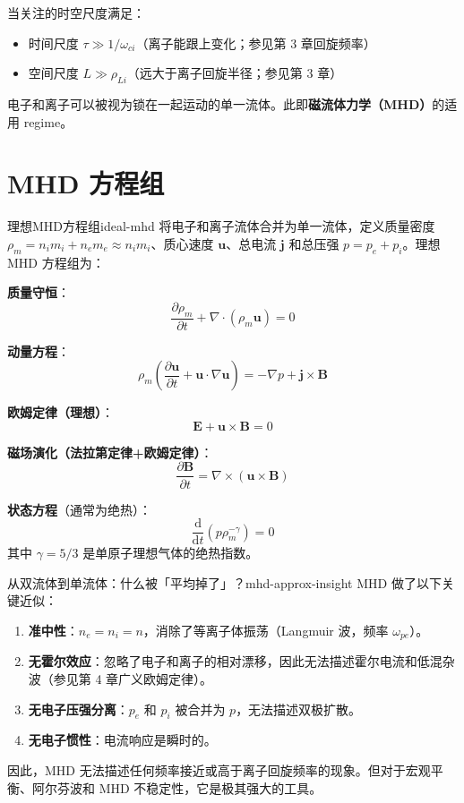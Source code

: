 \documentclass[12pt,a4paper,openany,oneside]{book}
\newcommand{\diffmarktext}[1]{%
  \textcolor{coverMid!80}{\rule[-0.1em]{2pt}{0.9em}}\,%
  \textcolor{coverMid}{\footnotesize\textbf{[#1]}}%
}
\newcommand{\difficulty}[1]{\marginnote{\raggedright\diffmarktext{#1}}}
\newcommand{\diff}{\mathrm{d}}
\newcommand{\vect}[1]{\bm{#1}}
\newcommand{\grad}{\nabla}
\newcommand{\curl}{\nabla\times}
\newcommand{\divg}{\nabla\cdot}
\begin{document}
当关注的时空尺度满足：
\begin{itemize}
\item 时间尺度 $\tau \gg 1/\omega_{ci}$（离子能跟上变化；参见第 3 章回旋频率）
\item 空间尺度 $L \gg \rho_{Li}$（远大于离子回旋半径；参见第 3 章）
\end{itemize}
电子和离子可以被视为锁在一起运动的单一流体。此即\textbf{磁流体力学（MHD）}的适用 regime。

\section{MHD 方程组}\difficulty{基础}
\label{sec:ch5-mhd}

\begin{theorem}{理想MHD方程组}{ideal-mhd}
将电子和离子流体合并为单一流体，定义质量密度 $\rho_m = n_i m_i + n_e m_e \approx n_i m_i$、质心速度 $\vect{u}$、总电流 $\vect{j}$ 和总压强 $p = p_e + p_i$。理想 MHD 方程组为：

\textbf{质量守恒}：
\[
\frac{\partial\rho_m}{\partial t} + \divg(\rho_m\vect{u}) = 0
\]

\textbf{动量方程}：
\[
\rho_m\left(\frac{\partial\vect{u}}{\partial t} + \vect{u}\cdot\grad\vect{u}\right) = -\grad p + \vect{j}\times\vect{B}
\]

\textbf{欧姆定律（理想）}：
\[
\vect{E} + \vect{u}\times\vect{B} = 0
\]

\textbf{磁场演化（法拉第定律+欧姆定律）}：
\[
\frac{\partial\vect{B}}{\partial t} = \curl(\vect{u}\times\vect{B})
\]

\textbf{状态方程}（通常为绝热）：
\[
\frac{\diff}{\diff t}(p\rho_m^{-\gamma}) = 0
\]
其中 $\gamma = 5/3$ 是单原子理想气体的绝热指数。
\end{theorem}

\begin{insight}{从双流体到单流体：什么被「平均掉了」？}{mhd-approx-insight}
MHD 做了以下关键近似：
\begin{enumerate}
\item \textbf{准中性}：$n_e = n_i = n$，消除了等离子体振荡（Langmuir 波，频率 $\omega_{pe}$）。
\item \textbf{无霍尔效应}：忽略了电子和离子的相对漂移，因此无法描述霍尔电流和低混杂波（参见第 4 章广义欧姆定律）。
\item \textbf{无电子压强分离}：$p_e$ 和 $p_i$ 被合并为 $p$，无法描述双极扩散。
\item \textbf{无电子惯性}：电流响应是瞬时的。
\end{enumerate}
因此，MHD 无法描述任何频率接近或高于离子回旋频率的现象。但对于宏观平衡、阿尔芬波和 MHD 不稳定性，它是极其强大的工具。
\end{insight}
\end{document}
